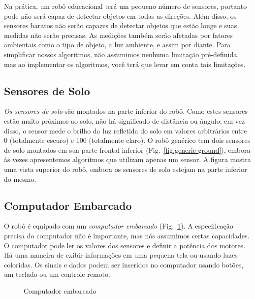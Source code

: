 Na prática, um robô educacional terá um pequeno número de sensores, portanto pode não será capaz de detectar objetos em todas as direções. Além disso, os sensores baratos não serão capazes de detectar objetos que estão longe e suas medidas não serão precisas. As medições também serão afetadas por fatores ambientais como o tipo de objeto, a luz ambiente, e assim por diante. Para simplificar nossos algoritmos, não assumimos nenhuma limitação pré-definida, mas ao implementar os algoritmos, você terá que levar em conta tais limitações.

\subsection{Sensores de Solo}

\emph{Os sensores de solo} são montados na parte inferior do robô. Como estes sensores estão muito próximos ao solo, não há significado de distância ou ângulo; em vez disso, o sensor mede o brilho da luz refletida do solo em valores arbitrários entre $0$ (totalmente escuro) e $100$ (totalmente claro). O robô genérico tem dois sensores de solo montados em sua parte frontal inferior (Fig.~\ref{fig.generic-ground}), embora às vezes apresentemos algoritmos que utilizam apenas um sensor. A figura mostra uma vista superior do robô, embora os sensores de solo estejam na parte inferior do mesmo.

\subsection{Computador Embarcado}\label{s.embedded}

O robô é equipado com um \emph{computador embarcado} (Fig.~\ref{fig.computer}). A especificação precisa do computador não é importante, mas nós assumimos certas capacidades. O computador pode ler os valores dos sensores e definir a potência dos motores. Há uma maneira de exibir informações em uma pequena tela ou usando luzes coloridas. Os sinais e dados podem ser inseridos no computador usando botões, um teclado ou um controle remoto.

\begin{figure}
\begin{center}
\caption{Computador embarcado}\label{fig.computer}
\end{center}
\end{figure}

